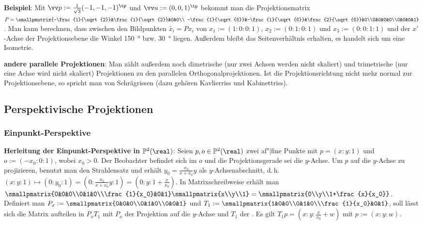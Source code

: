 \vspace{3mm}
\linie

\textbf{Beispiel}:
Mit $\vec{p} := \frac{1}{\sqrt{3}} (-1, -1, -1)^\tp$ und $\vec{u} := (0, 0, 1)^\tp$
bekommt man die Projektionsmatrix
$P = \smallpmatrix{-\frac{1}{\sqrt{2}}&\frac{1}{\sqrt{2}}&0&0\\
-\frac{1}{\sqrt{6}}&-\frac{1}{\sqrt{6}}&\frac{2}{\sqrt{6}}&0\\0&0&0&0\\0&0&0&1}$.
Man kann berechnen, dass zwischen den Bildpunkten $\widetilde{x_i} = Px_i$ von
$x_1 := (1:0:0:1)$, $x_2 := (0:1:0:1)$ und $x_3 := (0:0:1:1)$ und der $x'$-Achse der
Projektionsebene die Winkel \SI{150}{\degree} bzw. \SI{30}{\degree} liegen.
Außerdem bleibt das Seitenverhältnis erhalten, es handelt sich um eine Isometrie.

\textbf{andere parallele Projektionen}:
Man zählt außerdem noch dimetrische (nur zwei Achsen werden nicht skaliert)
und trimetrische (nur eine Achse wird nicht skaliert) Projektionen zu den parallelen
Orthogonalprojektionen.
Ist die Projektionsrichtung nicht mehr normal zur Projektionsebene, so spricht man von
Schrägrissen (dazu gehören Kavlierriss und Kabinettriss).

\pagebreak

\subsection{%
    Perspektivische Projektionen%
}

\subsubsection{%
    Einpunkt-Perspektive%
}

\textbf{Herleitung der Einpunkt-Perspektive in $\PP^2(\real)$}:
Seien $p, o \in \PP^2(\real)$ zwei af"|fine Punkte mit $p = (x:y:1)$ und $o := (-x_0:0:1)$,
wobei $x_0 > 0$.
Der Beobachter befindet sich im  $o$ und die Projektionsgerade sei die $y$-Achse.
Um $p$ auf die $y$-Achse zu projizieren, benutzt man den Strahlensatz und erhält
$y_0 = \frac{x_0}{x + x_0} y$ als $y$-Achsenabschnitt, d.\,h.\\
$(x:y:1) \mapsto (0:y_0:1) = (0:\frac{x_0}{x + x_0} y:1) = (0:y:1+\frac{x}{x_0})$.
In Matrixschreibweise erhält man\\
$\smallpmatrix{0&0&0\\0&1&0\\\frac{1}{x_0}&0&1} \smallpmatrix{x\\y\\1} =
\smallpmatrix{0\\y\\1+\frac{x}{x_0}}$.
Definiert man $P_x := \smallpmatrix{0&0&0\\0&1&0\\0&0&1}$ und
$T_1 := \smallpmatrix{1&0&0\\0&1&0\\\frac{1}{x_0}&0&1}$,
soll lässt sich die Matrix aufteilen in $P_x T_1$ mit
$P_x$ der Projektion auf die $y$-Achse und
$T_1$ der .
Es gilt $T_1 p = (x : y : \frac{x}{x_0} + w)$ mit $p := (x:y:w)$.

